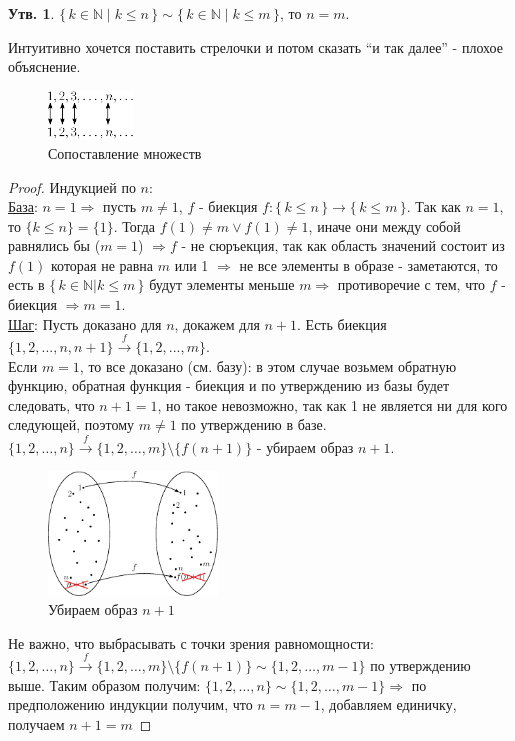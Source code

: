 \documentclass[12pt]{article}
\theoremstyle{definition}
\newtheorem{prop}{Утв.}
\begin{document}
\begin{prop}
$\{\, k \in \mathbb{N}\mid k \leq n \,\} \sim \{\, k \in \mathbb{N}\mid k \leq m \,\}$, то $n = m$.
\end{prop}

Интуитивно хочется поставить стрелочки и потом сказать ``и так далее'' - плохое объяснение.
 \begin{figure}[H]
	\centering
	\includegraphics[width=0.2\textwidth]{4_8.eps}
	\caption{Сопоставление множеств}
	\label{4_8}
\end{figure}

\begin{proof}
Индукцией по $n$:\\
\uline{База}: $n =1 \Rightarrow$ пусть $m \neq 1$, $f$ - биекция $f \colon \{\, k \leq n \,\} \rightarrow \{\, k \leq m \,\}$.
Так как $n = 1$, то $\{ k \leq n \} = \{ 1 \}$. Тогда $f(1) \neq m \vee f(1) \neq 1$, иначе они между собой равнялись бы ($m=1$) $\Rightarrow f$ - не сюръекция, так как область значений состоит из $f(1)$ которая не равна $m$ или 1 $\Rightarrow$ не все элементы в образе - заметаются, то есть в $\{\, k \in \mathbb{N}| k \leq m \,\}$ будут элементы меньше $m \Rightarrow$ противоречие с тем, что $f$ - биекция $\Rightarrow m = 1$.\\
\uline{Шаг}: Пусть доказано для $n$, докажем для $n+1$. Есть биекция $\{1,2,...,n,n+1\} \xrightarrow{f} \{1,2,...,m\}$.\\
Если $m = 1$, то все доказано (см. базу): в этом случае возьмем обратную функцию, обратная функция - биекция и по утверждению из базы будет следовать, что $n + 1 = 1$, но такое невозможно, так как 1 не является ни для кого следующей, поэтому $m \neq 1$ по утверждению в базе.\\
$\{1,2,\dotsc,n\} \xrightarrow{f} \{1,2,\dotsc,m\} \setminus \{f(n+1)\}$ - убираем образ $n+1$.
 
 \begin{figure}[H]
 	\centering
 	\includegraphics[width=0.4\textwidth]{4_9.eps}
 	\caption{Убираем образ $n+1$}
 	\label{4_9}
 \end{figure}
Не важно, что выбрасывать с точки зрения равномощности:\\ 
$ \{1,2,\dotsc,n\} \xrightarrow{f} \{1,2,\dotsc,m\} \setminus \{f(n+1)\} \sim \{1,2,\dotsc,m-1\}$ 
 по утверждению выше. Таким образом получим: $\{1,2,\dotsc, n\} \sim \{1,2,\dotsc, m-1\} \Rightarrow$ по предположению индукции получим, что $n = m-1$, добавляем единичку, получаем $n + 1 = m$ 
\end{proof} 
\end{document}
